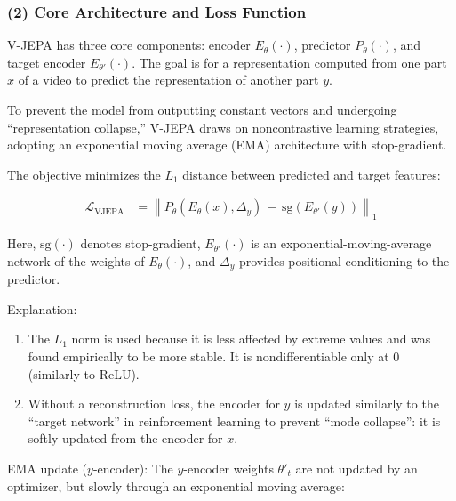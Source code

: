 \hypertarget{core-architecture-and-loss-function}{%
\subsubsection{(2) Core Architecture and Loss Function}\label{core-architecture-and-loss-function}}

V-JEPA has three core components: encoder \(E_\theta(\cdot)\), predictor \(P_\theta(\cdot)\), and target encoder \(E_{\theta'}(\cdot)\). The goal is for a representation computed from one part \(x\) of a video to predict the representation of another part \(y\).

To prevent the model from outputting constant vectors and undergoing ``representation collapse,'' V-JEPA draws on noncontrastive learning strategies, adopting an exponential moving average (EMA) architecture with stop-gradient.

The objective minimizes the \(L_1\) distance between predicted and target features:

\[
\begin{aligned}
\mathcal{L}_{\mathrm{VJEPA}}
&=
\left\|
P_\theta(E_\theta(x),\Delta_y)
\, - \, \mathrm{sg}(E_{\theta'}(y))
\right\|_1
\end{aligned}
\]

Here, \(\mathrm{sg}(\cdot)\) denotes stop-gradient, \(E_{\theta'}(\cdot)\) is an exponential-moving-average network of the weights of \(E_\theta(\cdot)\), and \(\Delta_y\) provides positional conditioning to the predictor.

Explanation:

\begin{enumerate}
\def\labelenumi{\arabic{enumi}.}
\item
  The \(L_1\) norm is used because it is less affected by extreme values and was found empirically to be more stable. It is nondifferentiable only at \(0\) (similarly to ReLU).
\item
  Without a reconstruction loss, the encoder for \(y\) is updated similarly to the ``target network'' in reinforcement learning to prevent ``mode collapse'': it is softly updated from the encoder for \(x\).
\end{enumerate}

EMA update (\(y\)-encoder): The \(y\)-encoder weights \(\theta'_t\) are not updated by an optimizer, but slowly through an exponential moving average:


